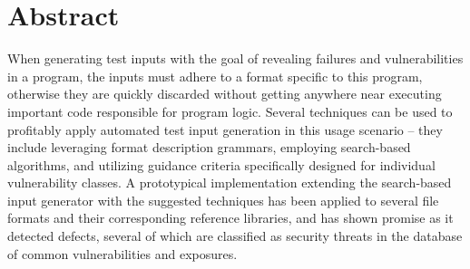 \section*{Abstract}
When generating test inputs with the goal of revealing failures and vulnerabilities in a program, 
the inputs must adhere to a format specific to this program, otherwise they are 
quickly discarded without getting anywhere near executing important code responsible for program logic.
Several techniques can be used to profitably apply automated test input generation in this usage scenario --
they include leveraging format description grammars, employing search-based algorithms,
and utilizing guidance criteria specifically designed for individual vulnerability classes.
A prototypical implementation extending the search-based input generator \xmlmate with the suggested
techniques has been applied to several file formats and their corresponding reference libraries, and has shown
promise as it detected defects, several of which are classified as security threats in the database of common
vulnerabilities and exposures. 
